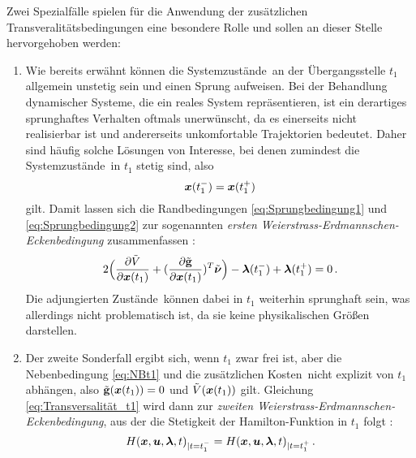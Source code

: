 Zwei Spezialfälle spielen für die Anwendung der zusätzlichen Transveralitätsbedingungen eine besondere Rolle und sollen an dieser Stelle hervorgehoben werden: 
\begin{enumerate}
	\item Wie bereits erwähnt können die Systemzustände \xoft\,an der Übergangsstelle $t_1$ allgemein unstetig sein und einen Sprung aufweisen. Bei der Behandlung dynamischer Systeme, die ein reales System repräsentieren, ist ein derartiges sprunghaftes Verhalten oftmals unerwünscht, da es einerseits nicht realisierbar ist und andererseits unkomfortable Trajektorien bedeutet. Daher sind häufig solche Lösungen von Interesse, bei denen zumindest die Systemzustände \xoft\,in $t_1$ stetig sind, also 
	\begin{equation}
		\boldsymbol{x}(t_1^-) = \boldsymbol{x}(t_1^+) \label{eq:Stetigkeit_t1}
	\end{equation}
	gilt. Damit lassen sich die Randbedingungen \eqref{eq:Sprungbedingung1} und \eqref{eq:Sprungbedingung2} zur sogenannten \textit{ersten Weierstrass-Erdmannschen-Eckenbedingung} zusammenfassen \cite{Gerdts.2010}:
	\begin{equation}
		2\Big(\frac{\partial \tilde{V}}{\partial \boldsymbol{x}(t_1)} + (\frac{\partial \tilde{\mathbf{g}}}{\partial \boldsymbol{x}(t_1)})^T\tilde{\boldsymbol{\nu}}\Big) - \boldsymbol{\lambda}(t_1^-) + \boldsymbol{\lambda}(t_1^+) = 0\,. \label{eq:WeierstrassErdmann1}
	\end{equation}
	Die adjungierten Zustände \lambdaoft\,können dabei in $t_1$ weiterhin sprunghaft sein, was allerdings nicht problematisch ist, da sie keine physikalischen Größen darstellen.
	\item Der zweite Sonderfall ergibt sich, wenn $t_1$ zwar frei ist, aber die Nebenbedingung \eqref{eq:NBt1} und die zusätzlichen Kosten \Vofxoftone\,nicht explizit von $t_1$ abhängen, also $\tilde{\mathbf{g}}(\boldsymbol{x}(t_1)) = 0$ und $\tilde{V}(\boldsymbol{x}(t_1))$ gilt. Gleichung \eqref{eq:Transversalität_t1} wird dann zur \textit{zweiten Weierstrass-Erdmannschen-Eckenbedingung}, aus der die Stetigkeit der Hamilton-Funktion in $t_1$ folgt \cite{Gerdts.2010}:
	\begin{equation}
	H(\boldsymbol{x},\boldsymbol{u},\boldsymbol{\lambda},t)_{|t=t_1^-} = H(\boldsymbol{x},\boldsymbol{u},\boldsymbol{\lambda},t)_{|t=t_1^+}\,. \label{eq:WeierstrassErdmann2}
	\end{equation}
\end{enumerate}
